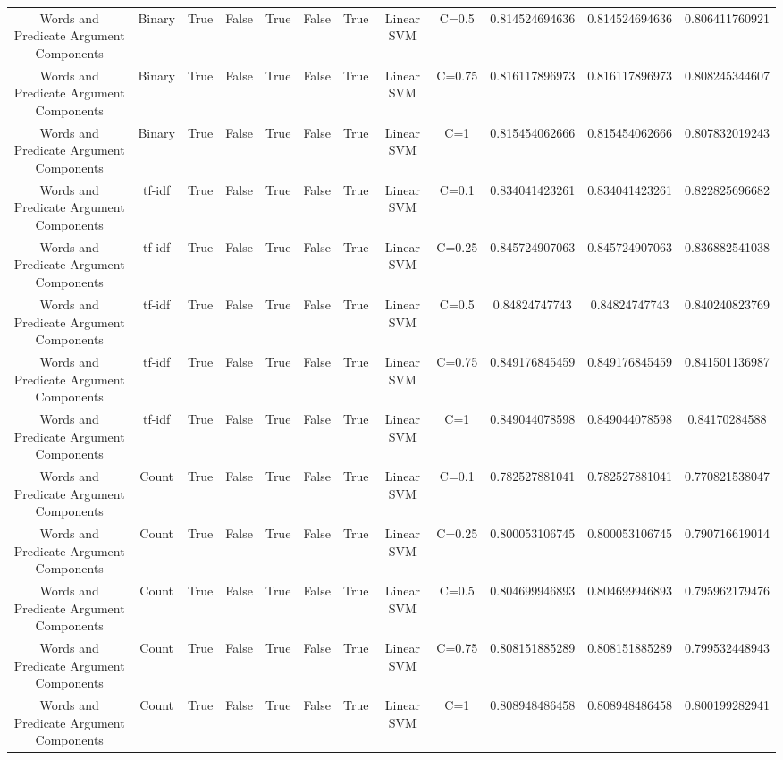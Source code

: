 \documentclass[11pt]{article}
\begin{document}
\begin{tabular}{|c|c|c|c|c|c|c|c|c|c|c|c|}
Words and Predicate Argument Components & Binary & True & False & True & False & True & Linear SVM & C=0.5 & 0.814524694636 & 0.814524694636 & 0.806411760921 \\ 
Words and Predicate Argument Components & Binary & True & False & True & False & True & Linear SVM & C=0.75 & 0.816117896973 & 0.816117896973 & 0.808245344607 \\ 
Words and Predicate Argument Components & Binary & True & False & True & False & True & Linear SVM & C=1 & 0.815454062666 & 0.815454062666 & 0.807832019243 \\ 
Words and Predicate Argument Components & tf-idf & True & False & True & False & True & Linear SVM & C=0.1 & 0.834041423261 & 0.834041423261 & 0.822825696682 \\ 
Words and Predicate Argument Components & tf-idf & True & False & True & False & True & Linear SVM & C=0.25 & 0.845724907063 & 0.845724907063 & 0.836882541038 \\ 
Words and Predicate Argument Components & tf-idf & True & False & True & False & True & Linear SVM & C=0.5 & 0.84824747743 & 0.84824747743 & 0.840240823769 \\ 
Words and Predicate Argument Components & tf-idf & True & False & True & False & True & Linear SVM & C=0.75 & 0.849176845459 & 0.849176845459 & 0.841501136987 \\ 
Words and Predicate Argument Components & tf-idf & True & False & True & False & True & Linear SVM & C=1 & 0.849044078598 & 0.849044078598 & 0.84170284588 \\ 
Words and Predicate Argument Components & Count & True & False & True & False & True & Linear SVM & C=0.1 & 0.782527881041 & 0.782527881041 & 0.770821538047 \\ 
Words and Predicate Argument Components & Count & True & False & True & False & True & Linear SVM & C=0.25 & 0.800053106745 & 0.800053106745 & 0.790716619014 \\ 
Words and Predicate Argument Components & Count & True & False & True & False & True & Linear SVM & C=0.5 & 0.804699946893 & 0.804699946893 & 0.795962179476 \\ 
Words and Predicate Argument Components & Count & True & False & True & False & True & Linear SVM & C=0.75 & 0.808151885289 & 0.808151885289 & 0.799532448943 \\ 
Words and Predicate Argument Components & Count & True & False & True & False & True & Linear SVM & C=1 & 0.808948486458 & 0.808948486458 & 0.800199282941 \\ 
\hline
  \end{tabular}
  
\end{document}
